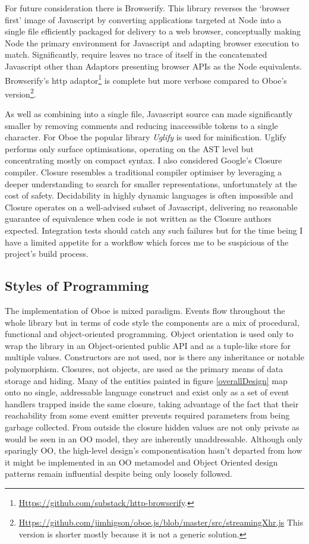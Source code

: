 \documentclass[]{article}
\begin{document}
For future consideration there is Browserify. This library reverses the
`browser first' image of Javascript by converting applications targeted
at Node into a single file efficiently packaged for delivery to a web
browser, conceptually making Node the primary environment for Javascript
and adapting browser execution to match. Significantly, require leaves
no trace of itself in the concatenated Javascript other than Adaptors
presenting browser APIs as the Node equivalents. Browserify's http
adaptor\footnote{\href{https://github.com/substack/http-browserify}{Https://github.com/substack/http-browserify}.}
is complete but more verbose compared to Oboe's version\footnote{\href{https://github.com/jimhigson/oboe.js/blob/master/src/streamingXhr.js}{Https://github.com/jimhigson/oboe.js/blob/master/src/streamingXhr.js}
  This version is shorter mostly because it is not a generic solution.}.

As well as combining into a single file, Javascript source can made
significantly smaller by removing comments and reducing inaccessible
tokens to a single character. For Oboe the popular library \emph{Uglify}
is used for minification. Uglify performs only surface optimisations,
operating on the AST level but concentrating mostly on compact syntax. I
also considered Google's Closure compiler. Closure resembles a
traditional compiler optimiser by leveraging a deeper understanding to
search for smaller representations, unfortunately at the cost of safety.
Decidability in highly dynamic languages is often impossible and Closure
operates on a well-advised subset of Javascript, delivering no
reasonable guarantee of equivalence when code is not written as the
Closure authors expected. Integration tests should catch any such
failures but for the time being I have a limited appetite for a workflow
which forces me to be suspicious of the project's build process.

\subsection{Styles of Programming}

The implementation of Oboe is mixed paradigm. Events flow throughout the
whole library but in terms of code style the components are a mix of
procedural, functional and object-oriented programming. Object
orientation is used only to wrap the library in an Object-oriented
public API and as a tuple-like store for multiple values. Constructors
are not used, nor is there any inheritance or notable polymorphism.
Closures, not objects, are used as the primary means of data storage and
hiding. Many of the entities painted in figure \ref{overallDesign} map
onto no single, addressable language construct and exist only as a set
of event handlers trapped inside the same closure, taking advantage of
the fact that their reachability from some event emitter prevents
required parameters from being garbage collected. From outside the
closure hidden values are not only private as would be seen in an OO
model, they are inherently unaddressable. Although only sparingly OO,
the high-level design's componentisation hasn't departed from how it
might be implemented in an OO metamodel and Object Oriented design
patterns remain influential despite being only loosely followed.
\end{document}
